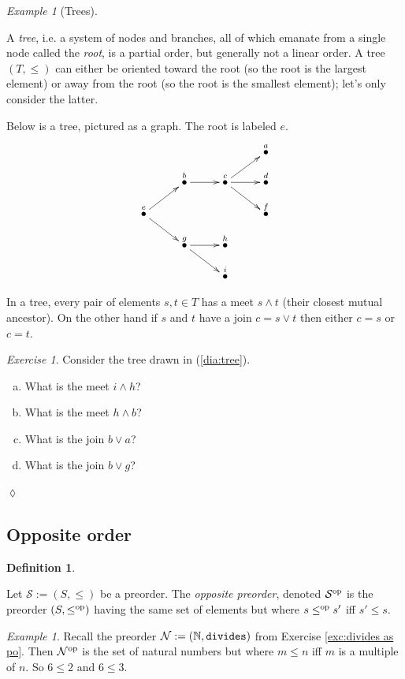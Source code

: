 \documentclass{book}
\def\tn{\textnormal}
\def\mc{\mathcal}
\def\NN{{\mathbb N}}
\def\op{^\tn{op}}
\newcommand{\LMO}[1]{\stackrel{#1}{\bullet}}
\def\mcN{\mc{N}}
\def\mcS{\mc{S}}
\theoremstyle{remark}
\newtheorem{example}[subsubsection]{Example}
\newtheorem{exc}[subsubsection]{Exercise}
\newenvironment{exercise}{\begin{exc}}{\hspace*{\fill}$\lozenge$\end{exc}}
\theoremstyle{definition}
\newtheorem{definition}[subsubsection]{Definition}
\def\sexc{\begin{enumerate}[a.)]\setlength{\itemsep}{.1cm}\setlength{\parskip}{.1cm}\item}
\def\next{\item}
\def\endsexc{\end{enumerate}}
\begin{document}
\begin{example}[Trees]\label{ex:tree}

A {\em tree}, i.e. a system of nodes and branches, all of which emanate from a single node called the {\em root}, is a partial order, but generally not a linear order. A tree $(T,\leq)$ can either be oriented toward the root (so the root is the largest element) or away from the root (so the root is the smallest element); let's only consider the latter. 

Below is a tree, pictured as a graph. The root is labeled $e$.
\begin{align}\label{dia:tree}
\xymatrix@=10pt{
&&&&&&\LMO{a}\\
&&\LMO{b}\ar[rr]&&\LMO{c}\ar[urr]\ar[rr]\ar[drr]&&\LMO{d}\\
\LMO{e}\ar[urr]\ar[drr]&&&&&&\LMO{f}\\
&&\LMO{g}\ar[rr]\ar[drr]&&\LMO{h}\\
&&&&\LMO{i}
}
\end{align}

In a tree, every pair of elements $s, t\in T$ has a meet $s\wedge t$ (their closest mutual ancestor). On the other hand if $s$ and $t$ have a join $c=s\vee t$ then either $c=s$ or $c=t$. 

\end{example}

\begin{exercise}
Consider the tree drawn in (\ref{dia:tree}).
\sexc What is the meet $i\wedge h$?
\next What is the meet $h\wedge b$?
\next What is the join $b\vee a$?
\next What is the join $b\vee g$?
\endsexc
\end{exercise}

\subsection{Opposite order}

\begin{definition}\label{def:opposite order}

Let $\mcS:=(S,\leq)$ be a preorder. The {\em opposite preorder}, denoted $\mcS\op$ is the preorder $(S,\leq\op)$ having the same set of elements but where $s\leq\op s'$ iff $s'\leq s$.

\end{definition}

\begin{example}

Recall the preorder $\mcN:=(\NN,{\tt divides})$ from Exercise \ref{exc:divides as po}. Then $\mcN\op$ is the set of natural numbers but where $m\leq n$ iff $m$ is a multiple of $n$. So $6\leq 2$ and $6\leq 3$.

\end{example}
\end{document}
